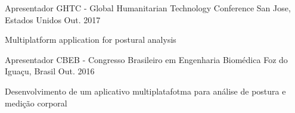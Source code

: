 \begin{cventries}

  \cventry
    {Apresentador}
    {GHTC - Global Humanitarian Technology Conference}
    {San Jose, Estados Unidos}
    {Out. 2017}
    {
      \begin{cvitems}
        \item {Multiplatform application for postural analysis}
      \end{cvitems}
    }

  \cventry
    {Apresentador}
    {CBEB - Congresso Brasileiro em Engenharia Biomédica}
    {Foz do Iguaçu, Brasil}
    {Out. 2016}
    {
      \begin{cvitems}
        \item {Desenvolvimento de um aplicativo multiplatafotma para análise de postura e medição corporal}
      \end{cvitems}
    }
%
%
%
\end{cventries}
